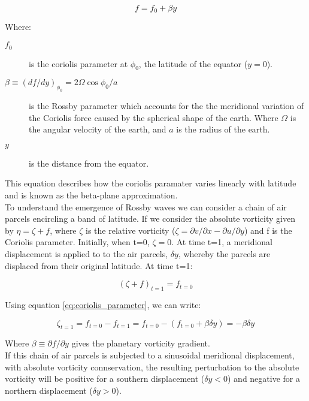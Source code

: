\documentclass{article}
\begin{document}
\begin{equation}
    f = f_0 + \beta y
    \label{eq:coriolis_parameter}
\end{equation}

Where:

\begin{description}
    \item[$f_0$] is the coriolis parameter at $\phi_0$, the latitude of the equator ($y=0$).
    \item[$\beta \equiv (df/dy)_{\phi_0} = 2 \Omega \cos{\phi_0/a}$]  is the Rossby parameter which accounts for the the meridional variation of the Coriolis force caused by the spherical shape of the earth. Where $\Omega$ is the angular velocity of the earth, and $a$ is the radius of the earth.
    \item[$y$] is the distance from the equator.
\end{description}

This equation describes how the coriolis paramater varies linearly with latitude and is known as the beta-plane approximation.\\

To understand the emergence of Rossby waves we can consider a chain of air parcels encircling a band of latitude. If we consider the absolute vorticity given by $\eta = \zeta + f$, where $\zeta$ is the relative vorticity ($\zeta = \partial v / \partial x - \partial u / \partial y$) and f is the Coriolis parameter. Initially, when t=0, $\zeta = 0$. At time t=1, a meridional displacement is applied to to the air parcels, $\delta y$, whereby the parcels are displaced from their original latitude. At time t=1:

\begin{equation}
    (\zeta + f)_{t=1} = f_{t=0}
    \label{eq:zeta}
\end{equation}

Using equation \ref{eq:coriolis_parameter}, we can write:

\begin{equation}
    \zeta_{t=1} = f_{t=0} - f_{t=1} = f_{t=0} - (f_{t=0} + \beta \delta y) = -\beta \delta y
    \label{eq:zeta_rearanged}
\end{equation}

Where $\beta \equiv \partial f/ \partial y$ gives the planetary vorticity gradient.\\


If this chain of air parcels is subjected to a sinusoidal meridional displacement, with absolute vorticity connservation, the resulting perturbation to the absolute vorticity will be positive for a southern displacement ($\delta y < 0$) and negative for a northern displacement ($\delta y > 0$).\\
\end{document}

